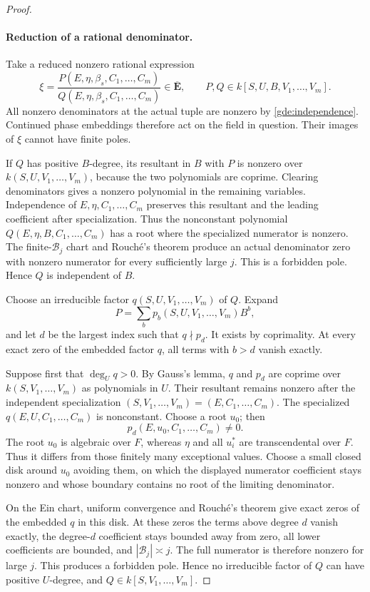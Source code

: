 \documentclass[11pt]{article}
\theoremstyle{definition}
\theoremstyle{remark}
\begin{document}
\begin{proof}
\paragraph{Reduction of a rational denominator.}
Take a reduced nonzero rational expression
\[
 \xi=\frac{P(E,\eta,\beta_s,C_1,\ldots,C_m)}
          {Q(E,\eta,\beta_s,C_1,\ldots,C_m)}
       \in\overline{\mathbf E},
 \qquad
 P,Q\in k[S,U,B,V_1,\ldots,V_m].
\]
All nonzero denominators at the actual tuple are nonzero by
\eqref{gde:independence}.  Continued phase embeddings therefore
act on the field in question.  Their images of $\xi$ cannot have
finite poles.

If $Q$ has positive $B$-degree, its resultant in $B$ with $P$ is
nonzero over $k(S,U,V_1,\ldots,V_m)$, because the two polynomials
are coprime.  Clearing denominators gives a nonzero polynomial in
the remaining variables.  Independence of $E,\eta,C_1,\ldots,C_m$
preserves this resultant and the leading coefficient after
specialization.  Thus the nonconstant polynomial
$Q(E,\eta,B,C_1,\ldots,C_m)$ has a root where the specialized
numerator is nonzero.  The finite-$\mathscr B_j$ chart and
Rouch\'e's theorem produce an actual denominator zero with
nonzero numerator for every sufficiently large $j$.
This is a forbidden pole.  Hence $Q$ is independent of $B$.

Choose an irreducible factor $q(S,U,V_1,\ldots,V_m)$ of $Q$.
Expand
\[
 P=\sum_b p_b(S,U,V_1,\ldots,V_m)B^b,
\]
and let $d$ be the largest index such that $q\nmid p_d$.
It exists by coprimality.  At every exact zero of the embedded
factor $q$, all terms with $b>d$ vanish exactly.

Suppose first that $\deg_U q>0$.  By Gauss's lemma, $q$ and $p_d$
are coprime over $k(S,V_1,\ldots,V_m)$ as polynomials in $U$.
Their resultant remains nonzero after the independent
specialization $(S,V_1,\ldots,V_m)=(E,C_1,\ldots,C_m)$.
The specialized $q(E,U,C_1,\ldots,C_m)$ is nonconstant.
Choose a root $u_0$; then
\[
 p_d(E,u_0,C_1,\ldots,C_m)\ne0.
\]
The root $u_0$ is algebraic over $F$, whereas $\eta$ and all
$u_i^*$ are transcendental over $F$.  Thus it differs from those
finitely many exceptional values.  Choose a small closed disk
around $u_0$ avoiding them, on which the displayed numerator
coefficient stays nonzero and whose boundary contains no root of
the limiting denominator.

On the Ein chart, uniform convergence and Rouch\'e's theorem
give exact zeros of the embedded $q$ in this disk.  At these zeros
the terms above degree $d$ vanish exactly, the degree-$d$
coefficient stays bounded away from zero, all lower coefficients
are bounded, and $|\mathscr B_j|\asymp j$.  The full numerator is
therefore nonzero for large $j$.  This produces a forbidden pole.
Hence no irreducible factor of $Q$ can have positive $U$-degree,
and $Q\in k[S,V_1,\ldots,V_m]$.


\end{proof}
\end{document}
